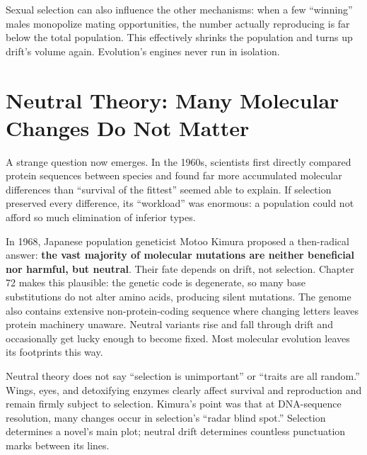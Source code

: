 Sexual selection can also influence the other mechanisms: when a few ``winning'' males monopolize mating opportunities, the number actually reproducing is far below the total population. This effectively shrinks the population and turns up drift's volume again. Evolution's engines never run in isolation.

\section{Neutral Theory: Many Molecular Changes Do Not Matter}

A strange question now emerges. In the 1960s, scientists first directly compared protein sequences between species and found far more accumulated molecular differences than ``survival of the fittest'' seemed able to explain. If selection preserved every difference, its ``workload'' was enormous: a population could not afford so much elimination of inferior types.

In 1968, Japanese population geneticist Motoo Kimura proposed a then-radical answer: \textbf{the vast majority of molecular mutations are neither beneficial nor harmful, but neutral}. Their fate depends on drift, not selection. Chapter 72 makes this plausible: the genetic code is degenerate, so many base substitutions do not alter amino acids, producing silent mutations. The genome also contains extensive non-protein-coding sequence where changing letters leaves protein machinery unaware. Neutral variants rise and fall through drift and occasionally get lucky enough to become fixed. Most molecular evolution leaves its footprints this way.

Neutral theory does not say ``selection is unimportant'' or ``traits are all random.'' Wings, eyes, and detoxifying enzymes clearly affect survival and reproduction and remain firmly subject to selection. Kimura's point was that at DNA-sequence resolution, many changes occur in selection's ``radar blind spot.'' Selection determines a novel's main plot; neutral drift determines countless punctuation marks between its lines.

